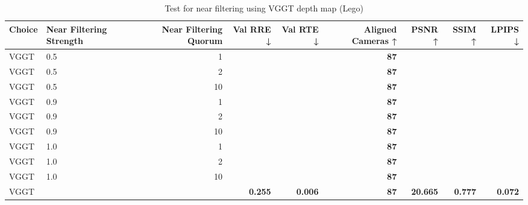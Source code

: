 \begin{table}[H]
\caption{Test for near filtering using VGGT depth map (Lego)}
\label{tab:99_near_filtering_lego}
\begin{tabular}{llrrrrrrr}
\toprule
Choice & Near Filtering Strength & Near Filtering Quorum & Val RRE ↓ & Val RTE ↓ & Aligned Cameras ↑ & PSNR ↑ & SSIM ↑ & LPIPS ↓ \\
\midrule
VGGT & 0.5 & 1 &  &  & \textbf{87} &  &  &  \\
VGGT & 0.5 & 2 &  &  & \textbf{87} &  &  &  \\
VGGT & 0.5 & 10 &  &  & \textbf{87} &  &  &  \\
VGGT & 0.9 & 1 &  &  & \textbf{87} &  &  &  \\
VGGT & 0.9 & 2 &  &  & \textbf{87} &  &  &  \\
VGGT & 0.9 & 10 &  &  & \textbf{87} &  &  &  \\
VGGT & 1.0 & 1 &  &  & \textbf{87} &  &  &  \\
VGGT & 1.0 & 2 &  &  & \textbf{87} &  &  &  \\
VGGT & 1.0 & 10 &  &  & \textbf{87} &  &  &  \\
VGGT &  &  & \textbf{0.255} & \textbf{0.006} & \textbf{87} & \textbf{20.665} & \textbf{0.777} & \textbf{0.072} \\
\bottomrule
\end{tabular}
\end{table}
